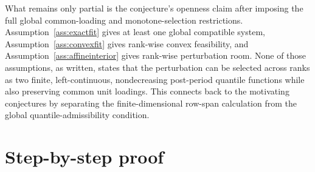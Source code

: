 \documentclass[11pt]{article}
\theoremstyle{definition}
\theoremstyle{plain}
\theoremstyle{remark}
\begin{document}
What remains only partial is the conjecture's openness claim after imposing the full global common-loading and monotone-selection restrictions.  Assumption~\ref{ass:exactfit} gives at least one global compatible system, Assumption~\ref{ass:convexfit} gives rank-wise convex feasibility, and Assumption~\ref{ass:affineinterior} gives rank-wise perturbation room.  None of those assumptions, as written, states that the perturbation can be selected across ranks as two finite, left-continuous, nondecreasing post-period quantile functions while also preserving common unit loadings.  This connects back to the motivating conjectures by separating the finite-dimensional row-span calculation from the global quantile-admissibility condition.

\section{Step-by-step proof}
\end{document}
